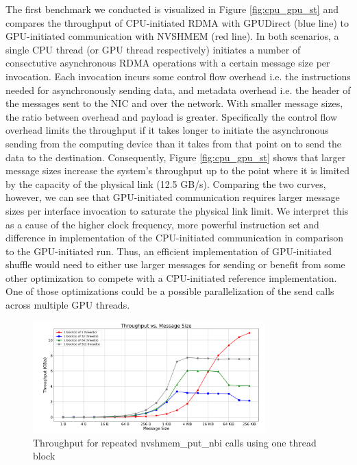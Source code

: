 The first benchmark we conducted is visualized in Figure \ref{fig:cpu_gpu_st} and compares the throughput of CPU-initiated RDMA with GPUDirect (blue line) to GPU-initiated communication with NVSHMEM (red line).
In both scenarios, a single CPU thread (or GPU thread respectively) initiates a number of consectutive asynchronous RDMA operations with a certain message size per invocation.
Each invocation incurs some control flow overhead i.e. the instructions needed for asynchronously sending data, and metadata overhead i.e. the header of the messages sent to the NIC and over the network.
With smaller message sizes, the ratio between overhead and payload is greater.
Specifically the control flow overhead limits the throughput if it takes longer to initiate the asynchronous sending from the computing device than it takes from that point on to send the data to the destination.
Consequently, Figure \ref{fig:cpu_gpu_st} shows that larger message sizes increase the system's throughput up to the point where it is limited by the capacity of the physical link (12.5 GB/s).
Comparing the two curves, however, we can see that GPU-initiated communication requires larger message sizes per interface invocation to saturate the physical link limit.
We interpret this as a cause of the higher clock frequency, more powerful instruction set and difference in implementation of the CPU-initiated communication in comparison to the GPU-initiated run.
Thus, an efficient implementation of GPU-initiated shuffle would need to either use larger messages for sending or benefit from some other optimization to compete with a CPU-initiated reference implementation.
One of those optimizations could be a possible parallelization of the send calls across multiple GPU threads.

\begin{figure}[h]
    \centering
    \includegraphics[width=0.8\textwidth]{img/put_granularity_grid1.png}
    \caption{Throughput for repeated nvshmem\_put\_nbi calls using one thread block}
    \label{fig:put_gran_grid_1}
\end{figure}

